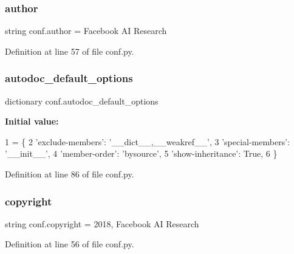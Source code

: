 \subsubsection{\texorpdfstring{author}{author}}
{\footnotesize\ttfamily string conf.\+author = \textquotesingle{}Facebook AI Research\textquotesingle{}}



Definition at line 57 of file conf.\+py.

\mbox{\label{namespaceconf_ae1323788e132618f5d7b9839f2adc5e3}} 
\subsubsection{\texorpdfstring{autodoc\+\_\+default\+\_\+options}{autodoc\_default\_options}}
{\footnotesize\ttfamily dictionary conf.\+autodoc\+\_\+default\+\_\+options}

{\bfseries Initial value\+:}
\begin{DoxyCode}
1 =  \{
2     \textcolor{stringliteral}{'exclude-members'}: \textcolor{stringliteral}{'\_\_dict\_\_,\_\_weakref\_\_'},
3     \textcolor{stringliteral}{'special-members'}: \textcolor{stringliteral}{'\_\_init\_\_'},
4     \textcolor{stringliteral}{'member-order'}: \textcolor{stringliteral}{'bysource'},
5     \textcolor{stringliteral}{'show-inheritance'}: \textcolor{keyword}{True},
6 \}
\end{DoxyCode}


Definition at line 86 of file conf.\+py.

\mbox{\label{namespaceconf_a33fa97cf51dcb25970fbf53f10159589}} 
\subsubsection{\texorpdfstring{copyright}{copyright}}
{\footnotesize\ttfamily string conf.\+copyright = \textquotesingle{}2018, Facebook AI Research\textquotesingle{}}



Definition at line 56 of file conf.\+py.

\mbox{\label{namespaceconf_a7ad48fb6f3e9b129c02346ea0d3527c1}} 
